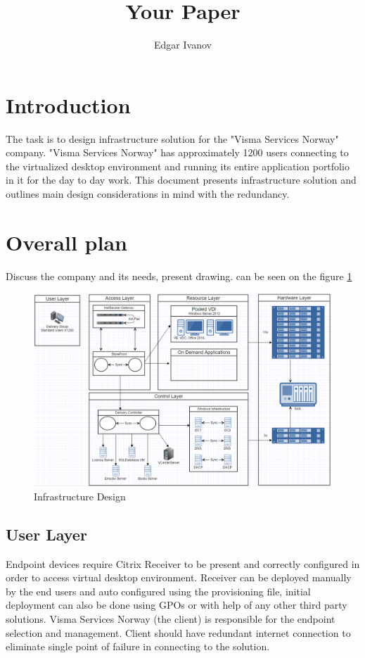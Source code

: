 \documentclass[a4paper]{article}
\title{Your Paper}
\author{Edgar Ivanov}
\begin{document}
	\maketitle
	
	
	
	\section{Introduction}
	
	The task is to design infrastructure solution for the "Visma Services Norway" company. "Visma Services Norway" has approximately 1200 users connecting to the virtualized desktop environment and running its entire application portfolio in it for the day to day work. This document presents infrastructure solution and outlines main design considerations in mind with the redundancy.
	
	\section{Overall plan}
	Discuss the company and its needs, present drawing. can be seen on the figure \ref{fig:Diagram}
	
	\begin{figure}
		\centering
		\includegraphics[width=1\textwidth]{InfrastructureDesign.png}
		\caption{\label{fig:Diagram}Infrastructure Design}
	\end{figure}
	
	\subsection{User Layer}
	Endpoint devices require Citrix Receiver to be present and correctly configured in order to access virtual desktop environment. Receiver can be deployed manually by the end users and auto configured using the provisioning file, initial deployment can also be done using GPOs or with help of any other third party solutions. Visma Services Norway (the client) is responsible for the endpoint selection and management. Client should have redundant internet connection to eliminate single point of failure in connecting to the solution.
\end{document}
